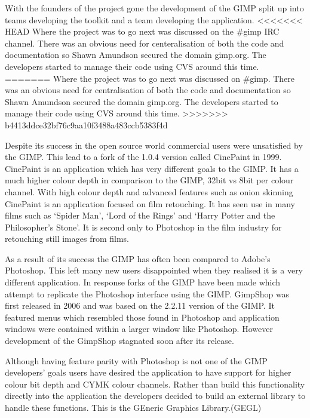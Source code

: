 \documentclass[a4 paper, 12pt]{article}
\begin{document}
	With the founders of the project gone the development of the GIMP split up
	into teams developing the toolkit and a team developing the application.
<<<<<<< HEAD
	Where the project was to go next was discussed on  the \#gimp IRC channel.
	There was an obvious need for centeralisation of both the code and
	documentation so Shawn Amundson secured the domain gimp.org. The developers
	started to manage their code using CVS around this time.
=======
	Where the project was to go next was discussed on #gimp. There was an
	obvious need for centralisation of both the code and documentation so Shawn
	Amundson secured the domain gimp.org. The developers started to manage their
	code using CVS around this time.
>>>>>>> b4413ddce32bf76c9aa10f3488a483ccb5383f4d

	Despite its success in the open source world commercial users were unsatisfied
	by the GIMP. This lead to a fork of the 1.0.4 version called CinePaint in
	1999.\cite{release} CinePaint is an application which has very different
	goals to the GIMP. It has a much higher colour depth in comparison to the
	GIMP, 32bit vs 8bit per colour channel. With high colour depth and advanced
	features such as onion skinning CinePaint is an application focused on film
	retouching. It has seen use in many films such as `Spider Man', `Lord of the
	Rings' and `Harry Potter and the Philosopher's Stone'. It is second only to
	Photoshop in the film industry for retouching still images from films.
	
	

	As a result of its success the GIMP has often been compared to Adobe's
	Photoshop. This left many new users disappointed when they realised it is a
	very different application. In response forks of the GIMP have been made
	which attempt to replicate the Photoshop interface using the GIMP. GimpShop
	was first released in 2006 and was based on the 2.2.11 version of the GIMP.
	It featured menus which resembled those found in Photoshop and application
	windows were contained within a larger window like Photoshop. However
	development of the GimpShop stagnated soon after its release.

	Although having feature parity with Photoshop is not one of the GIMP
	developers' goals users have desired the application to have support for
	higher colour bit depth and CYMK colour channels. Rather than build this
	functionality directly into the application the developers decided to build
	an external library to handle these functions. This is the GEneric Graphics
	Library.(GEGL)
\end{document}
